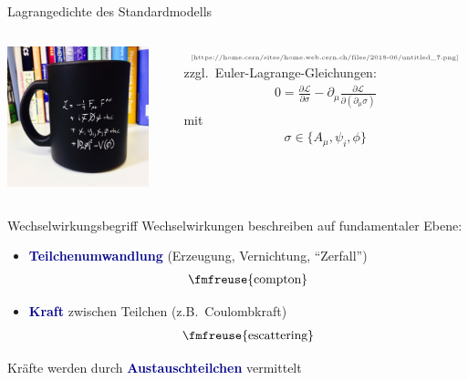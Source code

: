 \documentclass[hyperref={pdfpagelabels=false},ngerman]{beamer}
\newcommand{\fmfvcenter}[1]{\;\vcenter{\hbox{\fmfreuse{#1}}}\;}
\newcommand{\Lagr}{\mathcal{L}}
\newcommand{\mycite}[1]{\ensuremath{\text{\textcolor{darkgray}{\tiny [#1]}}}}
\renewcommand{\emph}[1]{\textbf{\textcolor{darkblue}{#1}}}
\begin{document}
\begin{frame}{Lagrangedichte des Standardmodells}
  \begin{columns}
    \begin{center}
      \includegraphics[width=0.9\textwidth]{images/cup.png}
    \end{center}
    \vspace*{-1em}
    \mycite{https://home.cern/sites/home.web.cern.ch/files/2018-06/untitled\_7.png}
    zzgl.\ Euler-Lagrange-Gleichungen:
    \begin{align*}
      0 = \frac{\partial\Lagr}{\partial\sigma} - \partial_\mu \frac{\partial\Lagr}{\partial(\partial_\mu\sigma)}
    \end{align*}
    mit
    \begin{align*}
      \sigma \in \{A_\mu, \psi_i, \phi\}
    \end{align*}
  \end{columns}
\end{frame}

\begin{frame}{Wechselwirkungsbegriff}
  Wechselwirkungen beschreiben auf fundamentaler Ebene:
  \begin{itemize}
  \item \emph{Teilchenumwandlung} (Erzeugung, Vernichtung, ``Zerfall'')
  \begin{align*}
    \fmfvcenter{compton}
  \end{align*}
  \item \emph{Kraft} zwischen Teilchen (z.B.\ Coulombkraft)
  \begin{align*}
    \fmfvcenter{escattering}
  \end{align*}
  \end{itemize}
  \vspace*{1em}
  Kräfte werden durch \emph{Austauschteilchen} vermittelt
\end{frame}
\end{document}
